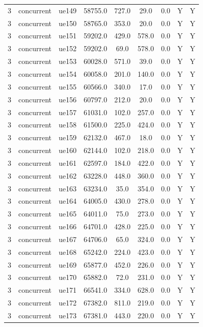 \begin{table}[ht]
\begin{tabular}{|c|c|c|c|c|c|c|c|c|}
3 & concurrent & ue149 & 58755.0 & 727.0 & 29.0 & 0.0 & Y & Y \\
3 & concurrent & ue150 & 58765.0 & 353.0 & 20.0 & 0.0 & Y & Y \\
3 & concurrent & ue151 & 59202.0 & 429.0 & 578.0 & 0.0 & Y & Y \\
3 & concurrent & ue152 & 59202.0 & 69.0 & 578.0 & 0.0 & Y & Y \\
3 & concurrent & ue153 & 60028.0 & 571.0 & 39.0 & 0.0 & Y & Y \\
3 & concurrent & ue154 & 60058.0 & 201.0 & 140.0 & 0.0 & Y & Y \\
3 & concurrent & ue155 & 60566.0 & 340.0 & 17.0 & 0.0 & Y & Y \\
3 & concurrent & ue156 & 60797.0 & 212.0 & 20.0 & 0.0 & Y & Y \\
3 & concurrent & ue157 & 61031.0 & 102.0 & 257.0 & 0.0 & Y & Y \\
3 & concurrent & ue158 & 61500.0 & 225.0 & 424.0 & 0.0 & Y & Y \\
3 & concurrent & ue159 & 62132.0 & 467.0 & 18.0 & 0.0 & Y & Y \\
3 & concurrent & ue160 & 62144.0 & 102.0 & 218.0 & 0.0 & Y & Y \\
3 & concurrent & ue161 & 62597.0 & 184.0 & 422.0 & 0.0 & Y & Y \\
3 & concurrent & ue162 & 63228.0 & 448.0 & 360.0 & 0.0 & Y & Y \\
3 & concurrent & ue163 & 63234.0 & 35.0 & 354.0 & 0.0 & Y & Y \\
3 & concurrent & ue164 & 64005.0 & 430.0 & 278.0 & 0.0 & Y & Y \\
3 & concurrent & ue165 & 64011.0 & 75.0 & 273.0 & 0.0 & Y & Y \\
3 & concurrent & ue166 & 64701.0 & 428.0 & 225.0 & 0.0 & Y & Y \\
3 & concurrent & ue167 & 64706.0 & 65.0 & 324.0 & 0.0 & Y & Y \\
3 & concurrent & ue168 & 65242.0 & 224.0 & 423.0 & 0.0 & Y & Y \\
3 & concurrent & ue169 & 65877.0 & 452.0 & 226.0 & 0.0 & Y & Y \\
3 & concurrent & ue170 & 65882.0 & 72.0 & 231.0 & 0.0 & Y & Y \\
3 & concurrent & ue171 & 66541.0 & 334.0 & 628.0 & 0.0 & Y & Y \\
3 & concurrent & ue172 & 67382.0 & 811.0 & 219.0 & 0.0 & Y & Y \\
3 & concurrent & ue173 & 67381.0 & 443.0 & 220.0 & 0.0 & Y & Y \\

\end{tabular}
\end{table}
